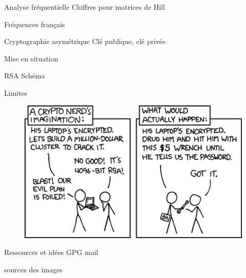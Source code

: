 \documentclass{beamer}
\begin{document}

\begin{frame}{Analyse fréquentielle}
  Chiffres pour matrices de Hill

  Fréquences français
  \end{frame}


\begin{frame}{Cryptographie asymétrique}
  Clé publique, clé privée

  Mise en situation
\end{frame}

\begin{frame}{RSA}
  Schéma
  \end{frame}

\begin{frame}{Limites}
  \begin{figure}
    \centering
    \includegraphics[scale = 0.5]{xkcdsecurity.png}
  \end{figure}
\end{frame}

\begin{frame}{Ressources et idées}
  GPG mail
  
  sources des images
  \end{frame}
\end{document}
